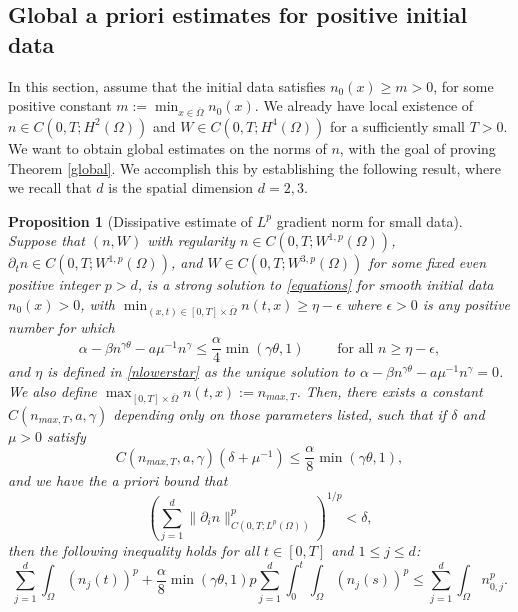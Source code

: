 \documentclass[12pt]{article}
\theoremstyle{plain}
\newtheorem{proposition}{Proposition}[section]
\begin{document}
\subsection{Global a priori estimates for positive initial data}\label{globalpositive}

In this section, assume that the initial data satisfies $n_{0}(x) \ge m > 0$, for some positive constant $m := \min_{x \in \overline{\Omega}} n_{0}(x)$. We already have local existence of $n \in C(0, T; H^{2}(\Omega))$ and $W \in C(0, T; H^{4}(\Omega))$ for a sufficiently small $T > 0$. We want to obtain global estimates on the norms of $n$, with the goal of proving Theorem \ref{global}. We accomplish this by establishing the following result, where we recall that $d$ is the spatial dimension $d = 2, 3$.

\begin{proposition}[Dissipative estimate of $L^{p}$ gradient norm for small data]\label{W1pcontrol} 
Suppose that $(n, W)$ with regularity $n \in C(0, T; W^{1, p}(\Omega))$, $\partial_{t}n \in C(0, T; W^{1, p}(\Omega))$, and $W \in C(0, T; W^{3, p}(\Omega))$ for some fixed even positive integer $p > d$, is a strong solution to \eqref{equations} for smooth initial data $n_{0}(x) > 0$, with $\min_{(x, t) \in [0, T] \times \overline{\Omega}} n(t, x) \ge \eta - \epsilon$ where $\epsilon > 0$ is any positive number for which
\begin{equation}\label{epsilondef}
\alpha - \beta n^{\gamma \theta} - a\mu^{-1} n^{\gamma} \le \frac{\alpha}{4}\min(\gamma \theta, 1) \qquad \text{ for all } n \ge \eta - \epsilon,
\end{equation}
and $\eta$ is defined in \eqref{nlowerstar} as the unique solution to $\alpha - \beta n^{\gamma \theta} - a\mu^{-1}n^{\gamma} = 0$. We also define $\max_{[0, T] \times \overline{\Omega}} n(t, x) := n_{max, T}$. Then, there exists a constant $C(n_{max, T}, a, \gamma)$ depending only on those parameters listed, such that if $\delta$ and $\mu > 0$ satisfy
\begin{equation*}
C(n_{max, T}, a, \gamma) (\delta + \mu^{-1}) \le \frac{\alpha}{8}\min(\gamma \theta, 1),
\end{equation*}
and we have the a priori bound that
\begin{equation}\label{aprioridelta}
\left(\sum_{j = 1}^{d} \|\partial_{i} n\|_{C(0, T; L^{p}(\Omega))}^{p}\right)^{1/p} < \delta,
\end{equation}
then the following inequality holds for all $t \in [0, T]$ and $1 \le j \le d$:
\begin{equation*}
\sum_{j = 1}^{d} \int_{\Omega} (n_{j}(t))^{p} + \frac{\alpha}{8} \min(\gamma \theta, 1) p \sum_{j = 1}^{d} \int_{0}^{t} \int_{\Omega} (n_{j}(s))^{p} \le \sum_{j = 1}^{d} \int_{\Omega} n_{0, j}^{p}.
\end{equation*}
\end{proposition}
\end{document}
